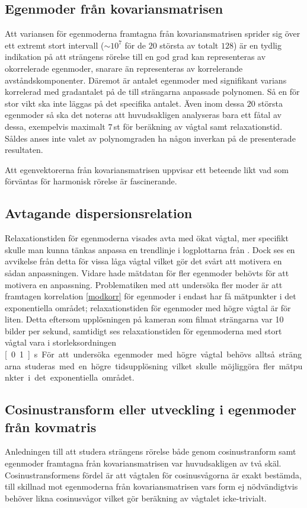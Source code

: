 \subsection{Egenmoder från kovariansmatrisen}
Att variansen för egenmoderna framtagna från kovariansmatrisen sprider sig över ett extremt stort intervall ($\sim 10^7$ för de $20$ största av totalt $128$) är en tydlig indikation på att strängens rörelse till en god grad kan representeras av okorrelerade egenmoder, snarare än representeras av korrelerande avståndskomponenter. Däremot är antalet egenmoder med signifikant varians korrelerad med gradantalet på de till strängarna anpassade polynomen. Så en för stor vikt ska inte läggas på det specifika antalet. Även inom dessa $20$ största egenmoder så ska det noteras att huvudsakligen analyseras bara ett fåtal av dessa, exempelvis maximalt $7$\,st för beräkning av vågtal samt relaxationstid. Såldes anses inte valet av polynomgraden ha någon inverkan på de presenterade resultaten. 

Att egenvektorerna från kovariansmatrisen uppvisar ett beteende likt vad som förväntas för harmonisk rörelse är fascinerande.  

\subsection{Avtagande dispersionsrelation}
Relaxationstiden för egenmoderna visades avta med ökat vågtal, mer specifikt skulle man kunna tänkas anpassa en trendlinje i logplottarna från . Dock ses en avvikelse från detta för vissa låga vågtal vilket gör det svårt att motivera en sådan anpassningen. Vidare hade mätdatan för fler egenmoder behövts för att motivera en anpassning. Problematiken med att undersöka fler moder är att framtagen korrelation \eqref{modkorr} för egenmoder i  endast har få mätpunkter i det exponentiella området; relaxationstiden för egenmoder med högre vågtal är för liten. Detta eftersom upplösningen på kameran som filmat strängarna var 10 bilder per sekund, samtidigt ses relaxationstiden för egenmoderna med stort vågtal vara i storleksordningen \unit[0.1]{s}. För att undersöka egenmoder med högre vågtal behövs alltså strängarna studeras med en högre tidsupplösning vilket skulle möjliggöra fler mätpunkter i det exponentiella området.

\subsection{Cosinustransform eller utveckling i egenmoder från kovmatris}
Anledningen till att studera strängens rörelse både genom cosinustranform samt egenmoder framtagna från kovariansmatrisen var huvudsakligen av två skäl. Cosinustransformens fördel är att vågtalen för cosinusvågorna är exakt bestämda, till skillnad mot egenmoderna från kovariansmatrisen vars form ej nödvändigtvis behöver likna cosinusvågor vilket gör beräkning av vågtalet icke-trivialt. %

